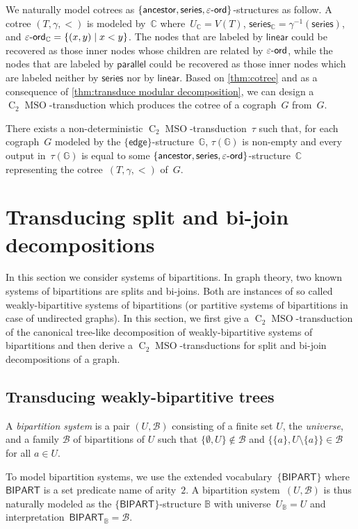 \documentclass{lmcs} %
\newcommand{\MSO}{\ensuremath{\operatorname{MSO}}\xspace}
\newcommand{\CMSO}[1][]{\ensuremath{\C[#1]{\!\!}\MSO}\xspace}
\newcommand{\C}[1][]{\ensuremath{\operatorname{C}_{#1}}\xspace}
\newcommand{\ancestor}{\mathsf{ancestor}}
\newcommand{\edge}{\ensuremath{\mathsf{edge}}\xspace}
\newcommand{\epsord}{\ensuremath{\varepsilon\text-\mathsf{ord}}\xspace}
\newcommand{\BIPARTITION}{\ensuremath{\mathsf{BIPART}}\xspace}
\newcommand\LINEAR{\ensuremath{\mathsf{linear}}\xspace}
\newcommand\SERIES{\ensuremath{\mathsf{series}}\xspace}
\newcommand\PARALLEL{\ensuremath{\mathsf{parallel}}\xspace}
\begin{document}
We naturally model cotrees as $\{\ancestor,\SERIES,\epsord\}$-structures as follow.
A cotree $(T,\gamma,<)$ is modeled by~$\mathbb{C}$
where~$U_{\mathbb{C}}=V(T)$, $\SERIES_{\mathbb{C}}=\gamma^{-1}(\SERIES)$, and $\epsord_{\mathbb{C}}=\{(x,y)\mid x<y\}$.
The nodes that are labeled by $\LINEAR$ could be recovered as those inner nodes whose children are related by $\epsord$,
while the nodes that are labeled by $\PARALLEL$ could be recovered as those inner nodes which are labeled neither by $\SERIES$ nor by $\LINEAR$.
Based on \autoref{thm:cotree} and as a consequence of \autoref{thm:transduce modular decomposition},
we can design a \CMSO[2]-transduction which produces the cotree of a cograph~$G$ from~$G$.
\begin{cor}
    \label{thm:transduce cotree}
    There exists a non-deterministic \CMSO[2]-transduction~$\tau$
    such that, for each cograph~$G$ modeled by the $\{\edge\}$-structure~$\mathbb{G}$,
    $\tau(\mathbb{G})$ is non-empty
    and every output in~$\tau(\mathbb{G})$ is equal to some $\{\ancestor,\SERIES,\epsord\}$-structure~$\mathbb{C}$
    representing the cotree~$(T,\gamma,<)$ of~$G$.
\end{cor}


\section{Transducing split and bi-join decompositions}\label{sec:split}
In this section we consider systems of bipartitions. In graph theory, two known systems of bipartitions are splits and bi-joins. Both are instances of so called weakly-bipartitive systems of bipartitions (or partitive systems of bipartitions in case of undirected graphs). In this section, we first give a \CMSO[2]-transduction of the canonical tree-like decomposition of weakly-bipartitive systems of bipartitions and then derive a \CMSO[2]-transductions for split and bi-join decompositions of a graph.
\subsection{Transducing weakly-bipartitive trees}
A \emph{bipartition system} is a pair $(U,\mathcal{B})$ consisting of a finite set $U$, the \emph{universe}, and a family $\mathcal{B}$ of bipartitions of $U$ such that $\{\emptyset,U\}\notin\mathcal{B}$ and
$\{\{a\},U\setminus \{a\}\}\in \mathcal{B}$ for all $a\in U$.

To model bipartition systems, we use the extended vocabulary~$\{\BIPARTITION\}$
where $\BIPARTITION$ is a set predicate name of arity~$2$.
A bipartition system~$(U,\mathcal{B})$ is thus naturally modeled
as the $\{\BIPARTITION\}$-structure $\mathbb{B}$
with universe~$U_{\mathbb{B}}=U$
and interpretation~$\BIPARTITION_{\mathbb{B}}=\mathcal{B}$.
\end{document}
